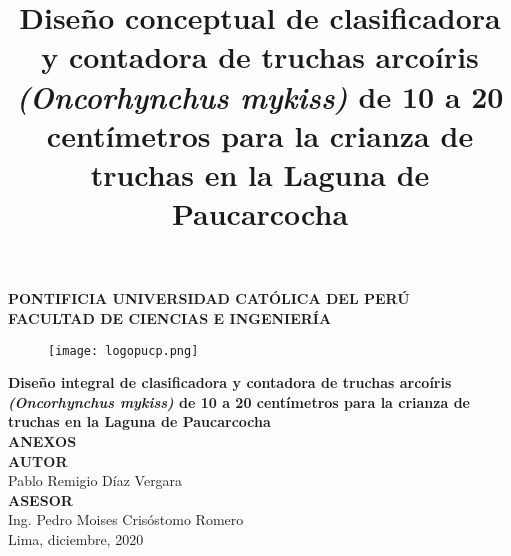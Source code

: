 \clearpage{\pagestyle{empty}\cleardoublepage}
\begin{titlepage}
	\begin{center}
		{\Large \bf PONTIFICIA UNIVERSIDAD CATÓLICA DEL PERÚ}\\
		\vspace{0.8 cm} 
		{\Large \bf FACULTAD DE CIENCIAS E INGENIERÍA}\\
		\vspace{1.75 cm}
		\begin{figure}[H]
			\centering
			\texttt{[image: logopucp.png]}
		\end{figure}
		\vspace{0.25cm}
		
		\title{Diseño conceptual de clasificadora y contadora de truchas arcoíris \textit{(Oncorhynchus mykiss)} de 10 a 20 centímetros para la crianza de truchas en la Laguna de Paucarcocha} %
		{\Large \bf Diseño integral de clasificadora y contadora de truchas arcoíris \textit{(Oncorhynchus mykiss)} de 10 a 20 centímetros para la crianza de truchas en la Laguna de Paucarcocha}\\ %
		\vspace{0.5cm}
		{\Large \bf ANEXOS}\\[2.0 cm]
		{\large \bf AUTOR}\\[0.5cm]
		{\large Pablo Remigio Díaz Vergara}\\[1.75 cm] %
		{\large \bf ASESOR}\\[0.5 cm] 
		{\large Ing. Pedro Moises Crisóstomo Romero}\\[0.5 cm] %
		\vspace{2.0 cm}
		{\large Lima, diciembre, 2020}
		
	\end{center}
\end{titlepage}